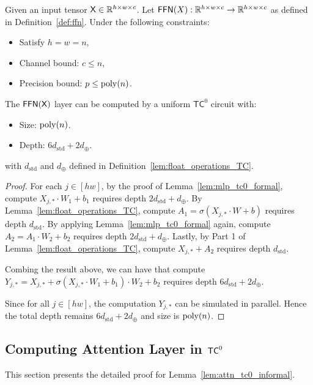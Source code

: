 \begin{lemma}\label{lem:ffn_tc0_formal}
 Given an input tensor $\mathsf{X}\in \mathbb{R}^{h \times w \times c}$. Let $\mathsf{FFN}(X):\mathbb{R}^{h \times w \times c} \to \mathbb{R}^{h \times w \times c}$ as defined in Definition~\ref{def:ffn}. Under the following constraints:
 \begin{itemize}
     \item Satisfy $h = w = n$,
         \item Channel bound: $c \leq n$,
         \item Precision bound: $p \leq \operatorname{poly}(n)$.
 \end{itemize}
The $\mathsf{FFN}(\mathsf{X})$ layer can be computed by a uniform $\mathsf{TC}^0$ circuit with:
\begin{itemize}
    \item Size: $\operatorname{poly}(n)$.
    \item Depth: $6d_\mathrm{std} + 2d_{\oplus}$.
\end{itemize}
with $d_{\mathrm{std}}$ and $d_{\oplus}$ defined in Definition~\ref{lem:float_operations_TC}.
\end{lemma}
\begin{proof}
    For each $j \in [hw]$, by the proof of Lemma~\ref{lem:mlp_tc0_formal}, compute $X_{j,*} \cdot W_1 + b_1$ requires depth $2d_{\mathrm{std}} + d_{\oplus}$. By Lemma~\ref{lem:float_operations_TC}, compute $A_1 = \sigma(X_{j,*} \cdot W + b)$ requires depth $d_{\mathrm{std}}$. By applying Lemma~\ref{lem:mlp_tc0_formal} again, compute $A_2 = A_1\cdot W_2 +b_2$ requires depth $2d_{\mathrm{std}} + d_{\oplus}$. Lastly, by Part 1 of Lemma~\ref{lem:float_operations_TC}, compute $X_{j,*} + A_2$ requires depth $d_{\mathrm{std}}$.
    
    Combing the result above, we can have that compute $Y_{j,*}=X_{j,*} + \sigma(X_{j,*} \cdot W_1 + b_1)\cdot W_2 +b_2$ requires depth $6d_{\mathrm{std}}+2d_{\oplus}$.

    Since for all $j \in [hw]$, the computation $Y_{j,*}$ can be simulated in parallel. Hence the total depth remains $6d_{\mathrm{std}}+2d_{\oplus}$ and size is $\operatorname{poly}(n)$.
\end{proof}

\subsection{Computing Attention Layer in \texorpdfstring{$\mathsf{TC}^0$}{} }\label{sec:app_attn_tc0}
This section presents the detailed proof for Lemma~\ref{lem:attn_tc0_informal}.

